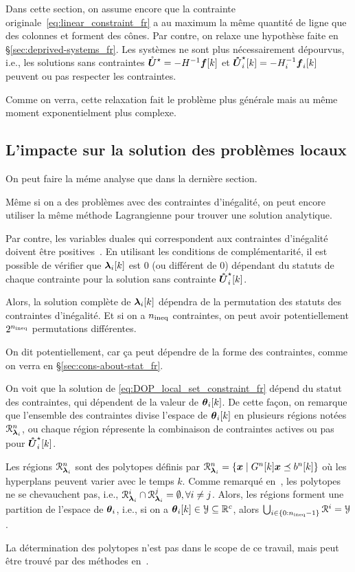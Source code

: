 \documentclass[../main.tex]{subfiles}
\begin{document}
Dans cette section, on assume encore que la contrainte originale~\eqref{eq:linear_constraint_fr} a au maximum la même quantité de ligne que des colonnes et forment des cônes.
Par contre, on relaxe une hypothèse faite en \S\ref{sec:deprived-systems_fr}.
Les systèmes ne sont plus nécessairement dépourvus, i.e., les solutions sans contraintes
${\mathring{\boldsymbol{U}}^{\star}}=-H^{-1}\boldsymbol{f}[k]$ et $\optuncUik=-H_{i}^{-1}\vec{f}_{i}[k]$ peuvent ou pas respecter les contraintes.

Comme on verra, cette relaxation fait le problème plus générale mais au même moment exponentielment plus complexe.

\subsection{L'impacte sur la solution des problèmes locaux}\label{sec:impact-local-problem_fr}
On peut faire la méme analyse que dans la dernière section.

Même si on a des problèmes \qp{} avec des contraintes d'inégalité, on peut encore utiliser la même méthode Lagrangienne pour trouver une solution analytique.

Par contre, les variables duales qui correspondent aux contraintes d'inégalité doivent être positives~\cite{BoydVandenberghe2004}.
En utilisant les conditions de complémentarité, il est possible de vérifier que $\lambdaik$ est $0$ (ou différent de $0$) dépendant du statuts de chaque contrainte pour la solution sans contrainte $\optuncUik$.

Alors, la solution complète de $\lambdaik$ dépendra de la permutation des statuts des contraintes d'inégalité.
Et si on a $n_{\text{ineq}}$ contraintes, on peut avoir potentiellement $2^{n_{\text{ineq}}}$ permutations différentes.
\begin{remark}
  On dit potentiellement, car ça peut dépendre de la forme des contraintes, comme on verra en \S\ref{sec:cons-about-stat_fr}.
\end{remark}

On voit que la solution de \eqref{eq:DOP_local_set_constraint_fr} dépend du statut des contraintes, qui dépendent de la valeur de $\thetaik$.
De cette façon, on remarque que l'ensemble des contraintes divise l'espace de $\thetaik$ en plusieurs régions notées $\mathcal{R}_{\boldsymbol{\lambda}_{i}}^{n}$, ou chaque région répresente la combinaison de contraintes actives ou pas pour $\optuncUik$.

Les régions $\mathcal{R}_{\boldsymbol{\lambda}_{i}}^{n}$ sont des polytopes définis par ${\mathcal{R}_{\boldsymbol{\lambda}_{i}}^{n}=\{\boldsymbol{x}\mid G^{n}[k]\boldsymbol{x} \preceq b^{n}[k]\}}$ où les hyperplans peuvent varier avec le temps $k$.
Comme remarqué en~\cite{BemporadEtAl2002}, les polytopes ne se chevauchent pas, i.e., ${\mathcal{R}_{\boldsymbol{\lambda}_{i}}^{i}\cap\mathcal{R}_{\boldsymbol{\lambda}_{i}}^{j}=\emptyset, \forall i\neq j}$.
Alors, les régions forment une partition de l'espace de $\boldsymbol{\theta}_{i}$, i.e., si on a $\thetaik\in\set{Y}\subseteq\R^{c}$, alors ${\bigcup_{i\in\{0:n_{\text{ineq}}-1\}}\mathcal{R}^{i}=\mathcal{Y}}$.
\begin{remark}
  La détermination des polytopes n'est pas dans le scope de ce travail, mais peut être trouvé par des méthodes en~\cite[\S4.1.3.2]{LauerBloch2019}.
\end{remark}
\end{document}
